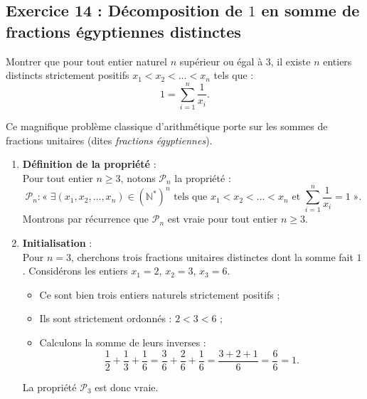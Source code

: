 \documentclass[11pt,a4paper]{article}
\newcommand{\N}{\mathbb{N}}
\begin{document}
\subsection*{Exercice 14 : Décomposition de $1$ en somme de fractions égyptiennes distinctes}

Montrer que pour tout entier naturel $n$ supérieur ou égal à $3$, il existe $n$ entiers distincts strictement positifs $x_1 < x_2 < \dots < x_n$ tels que :
\[
1 = \sum_{i=1}^n \frac{1}{x_i}.
\]

\begin{correctionbox}
Ce magnifique problème classique d'arithmétique porte sur les sommes de fractions unitaires (dites \textit{fractions égyptiennes}).

\begin{enumerate}[label=\textbf{\arabic*.}]
    \item \textbf{Définition de la propriété} :\\
    Pour tout entier $n \ge 3$, notons $\mathcal{P}_n$ la propriété :
    \[
    \mathcal{P}_n : « \; \exists (x_1, x_2, \dots, x_n) \in (\N^*)^n \text{ tels que } x_1 < x_2 < \dots < x_n \text{ et } \sum_{i=1}^n \frac{1}{x_i} = 1 \; ».
    \]
    Montrons par récurrence que $\mathcal{P}_n$ est vraie pour tout entier $n \ge 3$.

    \item \textbf{Initialisation} :\\
    Pour $n = 3$, cherchons trois fractions unitaires distinctes dont la somme fait $1$.
    Considérons les entiers $x_1 = 2$, $x_2 = 3$, $x_3 = 6$.
    \begin{itemize}
        \item Ce sont bien trois entiers naturels strictement positifs ;
        \item Ils sont strictement ordonnés : $2 < 3 < 6$ ;
        \item Calculons la somme de leurs inverses :
        \[
        \frac{1}{2} + \frac{1}{3} + \frac{1}{6} = \frac{3}{6} + \frac{2}{6} + \frac{1}{6} = \frac{3 + 2 + 1}{6} = \frac{6}{6} = 1.
        \]
    \end{itemize}
    La propriété $\mathcal{P}_3$ est donc vraie.


\end{enumerate}
\end{correctionbox}
\end{document}
